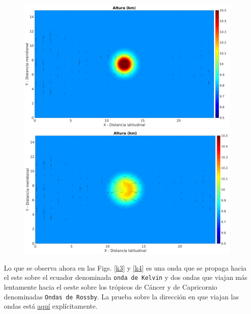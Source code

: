 \documentclass[12pt,dvipsnames]{exam}
\begin{document}
\begin{figure}[H]
\begin{minipage}[b]{0.5\linewidth} 
\centering
\includegraphics[scale=0.2]{k1.jpeg}
\caption{ }
\label{k1}
\end{minipage}
\hspace{0.1cm} 
\begin{minipage}[b]{0.5\linewidth}
\centering
\includegraphics[scale=0.2]{k2.jpeg}
\caption{}
\label{k2}
\end{minipage}
\end{figure}


Lo que se observa ahora en las Figs. \ref{k3} y \ref{k4} es una onda que se propaga hacia el este sobre el ecuador denominada \texttt{onda de Kelvin} y dos ondas que viajan más lentamente hacia el oeste sobre los trópicos de Cáncer y de Capricornio denominadas \texttt{Ondas de Rossby}. La prueba sobre la dirección en que viajan las ondas está \href{http://meteo.fisica.edu.uy/Materias/oceanografia/teorico_oceanografia/cap7.pdf}{aquí} explícitamente.  
\end{document}
